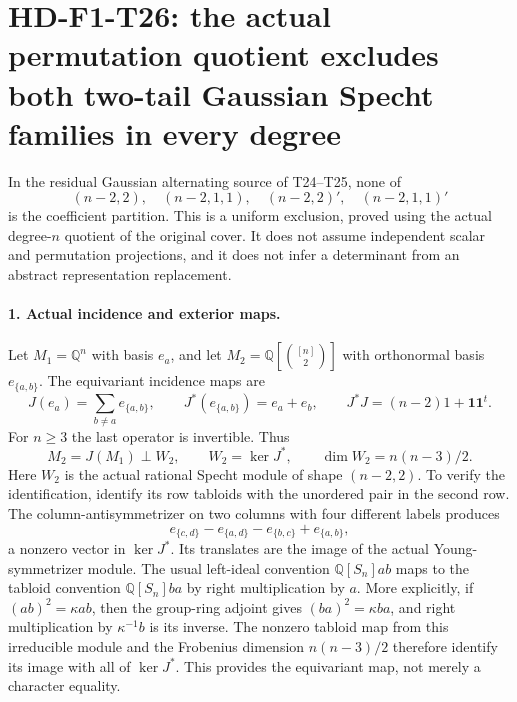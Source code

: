 \section[HD-F1-T26: the two-tail Gaussian Specht sources are excluded]{HD-F1-T26: the actual permutation quotient excludes both two-tail Gaussian Specht families in every degree}
\label{sec:f1-gaussian-two-tail-exclusion}

In the residual Gaussian alternating source of T24--T25,
none of
\[
 (n-2,2),\quad (n-2,1,1),\quad
 (n-2,2)',\quad (n-2,1,1)'
 \tag{F1T26.1}
\]
is the coefficient partition. This is a uniform exclusion,
proved using the actual degree-$n$ quotient of the original
cover. It does not assume independent scalar and permutation
projections, and it does not infer a determinant from an
abstract representation replacement.

\paragraph{1. Actual incidence and exterior maps.}
Let $M_1=\mathbb Q^n$ with basis $e_a$, and let
$M_2=\mathbb Q[\binom{[n]}2]$ with orthonormal basis
$e_{\{a,b\}}$. The equivariant incidence maps are
\[
 J(e_a)=\sum_{b\ne a}e_{\{a,b\}},\qquad
 J^*(e_{\{a,b\}})=e_a+e_b,
 \qquad J^*J=(n-2)1+\boldsymbol1\boldsymbol1^t.
 \tag{F1T26.2}
\]
For $n\ge3$ the last operator is invertible. Thus
\[
 M_2=J(M_1)\mathbin{\perp}W_2,\qquad W_2=\ker J^*,
 \qquad\dim W_2=n(n-3)/2.
 \tag{F1T26.3}
\]
Here $W_2$ is the actual rational Specht module of shape
$(n-2,2)$. To verify the identification, identify its row
tabloids with the unordered pair in the second row. The
column-antisymmetrizer on two columns with four different
labels produces
\[
           e_{\{c,d\}}-e_{\{a,d\}}
                    -e_{\{b,c\}}+e_{\{a,b\}},
\]
a nonzero vector in $\ker J^*$. Its translates are the
image of the actual Young-symmetrizer module. The usual
left-ideal convention $\mathbb Q[S_n]ab$ maps to the
tabloid convention $\mathbb Q[S_n]ba$ by right
multiplication by $a$. More explicitly, if
$(ab)^2=\kappa ab$, then the group-ring adjoint gives
$(ba)^2=\kappa ba$, and right multiplication by
$\kappa^{-1}b$ is its inverse. The nonzero tabloid
map from this irreducible module and the Frobenius
dimension $n(n-3)/2$ therefore identify its image with
all of $\ker J^*$. This provides the equivariant map,
not merely a character equality.

